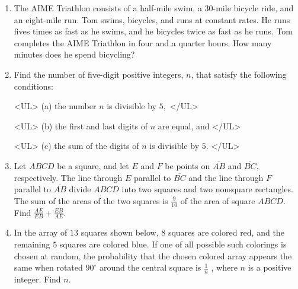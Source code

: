 \documentclass{article}
\begin{document}
\begin{enumerate}[label=\arabic*., itemsep=0.5em]\item The AIME Triathlon consists of a half-mile swim, a 30-mile bicycle ride, and an eight-mile run. Tom swims, bicycles, and runs at constant rates. He runs fives times as fast as he swims, and he bicycles twice as fast as he runs. Tom completes the AIME Triathlon in four and a quarter hours. How many minutes does he spend bicycling?\par \vspace{0.5em}\item Find the number of five-digit positive integers, \(n\), that satisfy the following conditions:

<UL>
(a) the number \(n\) is divisible by \(5,\)
</UL>

<UL>
(b) the first and last digits of \(n\) are equal, and
</UL>

<UL>
(c) the sum of the digits of \(n\) is divisible by \(5.\)
</UL>\par \vspace{0.5em}\item Let \(ABCD\) be a square, and let \(E\) and \(F\) be points on \(\overline{AB}\) and \(\overline{BC},\) respectively. The line through \(E\) parallel to \(\overline{BC}\) and the line through \(F\) parallel to \(\overline{AB}\) divide \(ABCD\) into two squares and two nonsquare rectangles. The sum of the areas of the two squares is \(\frac{9}{10}\) of the area of square \(ABCD.\) Find \(\frac{AE}{EB} + \frac{EB}{AE}.\)\par \vspace{0.5em}\item In the array of \(13\) squares shown below, \(8\) squares are colored red, and the remaining \(5\) squares are colored blue. If one of all possible such colorings is chosen at random, the probability that the chosen colored array appears the same when rotated \(90^{\circ}\) around the central square is \(\frac{1}{n}\) , where \(n\) is a positive integer. Find \(n\).



\end{enumerate}
\end{document}
